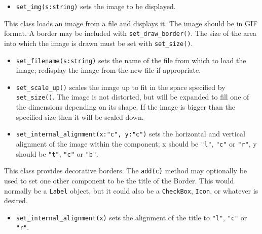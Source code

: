 \begin{itemize}
\item\noindent\texttt{set\_img(s:string)} sets the image to be displayed.
\end{itemize}

\medskip{}

This class loads an image from a file and displays it. The image should
be in GIF format. A border may be included with \texttt{set\_draw\_border()}.
The size of the area into which the image is drawn must be set with
\texttt{set\_size()}.

\begin{itemize}
\item\noindent\texttt{set\_filename(s:string)} sets the name of the file from which to load
the image; redisplay the image from the new file if appropriate.

\item\noindent\texttt{set\_scale\_up()} scales the image up to fit in the space
specified by \texttt{set\_size()}. The image is not distorted, but will be
expanded to fill one of the dimensions depending on its shape. If the
image is bigger than the specified size then it will be scaled down.

\item\noindent\texttt{set\_internal\_alignment(x:"c", y:"c")} sets the horizontal
and vertical alignment of the image within the component;
x should be \texttt{"l"}, \texttt{"c"} or \texttt{"r"},
y should be \texttt{"t"}, \texttt{"c"} or \texttt{"b"}.
\end{itemize}

\medskip{}

This class provides decorative borders. The \texttt{add(c)} method
may optionally be used to set one other
component to be the title of the Border. This would normally be a
 \texttt{Label} object, but it could also be a  \texttt{CheckBox},  \texttt{Icon}, or whatever is
desired.
\begin{itemize}
\item\noindent\texttt{set\_internal\_alignment(x)} sets the alignment of the title
to \texttt{"l"}, \texttt{"c"} or \texttt{"r"}.
\end{itemize}


